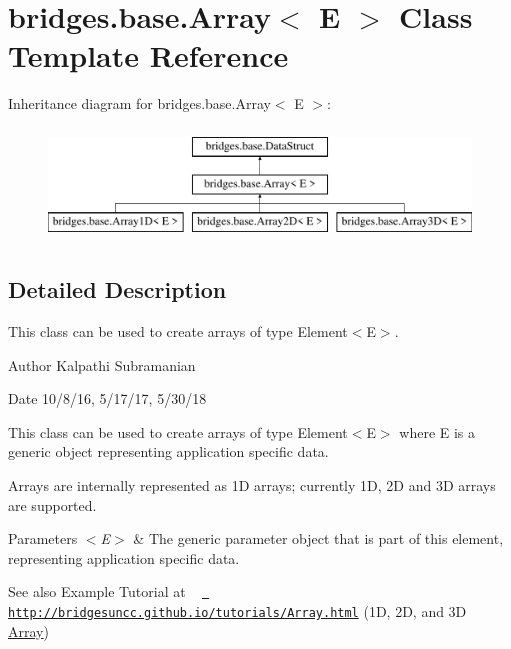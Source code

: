 \hypertarget{classbridges_1_1base_1_1_array}{}\section{bridges.\+base.\+Array$<$ E $>$ Class Template Reference}
\label{classbridges_1_1base_1_1_array}
Inheritance diagram for bridges.\+base.\+Array$<$ E $>$\+:\begin{figure}[H]
\begin{center}
\leavevmode
\includegraphics[height=3.000000cm]{classbridges_1_1base_1_1_array}
\end{center}
\end{figure}


\subsection{Detailed Description}
This class can be used to create arrays of type Element$<$\+E$>$. 

\begin{DoxyAuthor}{Author}
Kalpathi Subramanian
\end{DoxyAuthor}
\begin{DoxyDate}{Date}
10/8/16, 5/17/17, 5/30/18
\end{DoxyDate}
This class can be used to create arrays of type Element$<$\+E$>$ where E is a generic object representing application specific data.

Arrays are internally represented as 1D arrays; currently 1D, 2D and 3D arrays are supported.


\begin{DoxyParams}{Parameters}
{\em $<$\+E$>$} & The generic parameter object that is part of this element, representing application specific data.\\
\hline
\end{DoxyParams}
\begin{DoxySeeAlso}{See also}
Example Tutorial at ~\newline
 \href{http://bridgesuncc.github.io/tutorials/Array.html}{\texttt{ http\+://bridgesuncc.\+github.\+io/tutorials/\+Array.\+html}} (1D, 2D, and 3D \mbox{\hyperlink{classbridges_1_1base_1_1_array}{Array}})~\newline
 
\end{DoxySeeAlso}
